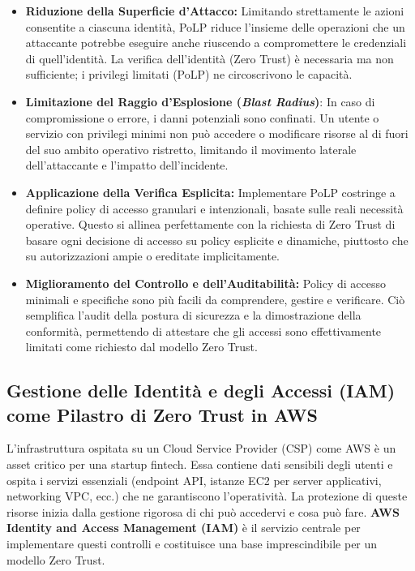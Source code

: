 \begin{itemize}
    \item \textbf{Riduzione della Superficie d'Attacco:} Limitando strettamente le azioni consentite a ciascuna identità, PoLP riduce l'insieme delle operazioni che un attaccante potrebbe eseguire anche riuscendo a compromettere le credenziali di quell'identità. La verifica dell'identità (Zero Trust) è necessaria ma non sufficiente; i privilegi limitati (PoLP) ne circoscrivono le capacità.
    \item \textbf{Limitazione del Raggio d'Esplosione (\textit{Blast Radius})}: In caso di compromissione o errore, i danni potenziali sono confinati. Un utente o servizio con privilegi minimi non può accedere o modificare risorse al di fuori del suo ambito operativo ristretto, limitando il movimento laterale dell'attaccante e l'impatto dell'incidente.
    \item \textbf{Applicazione della Verifica Esplicita:} Implementare PoLP costringe a definire policy di accesso granulari e intenzionali, basate sulle reali necessità operative. Questo si allinea perfettamente con la richiesta di Zero Trust di basare ogni decisione di accesso su policy esplicite e dinamiche, piuttosto che su autorizzazioni ampie o ereditate implicitamente.
    \item \textbf{Miglioramento del Controllo e dell'Auditabilità:} Policy di accesso minimali e specifiche sono più facili da comprendere, gestire e verificare. Ciò semplifica l'audit della postura di sicurezza e la dimostrazione della conformità, permettendo di attestare che gli accessi sono effettivamente limitati come richiesto dal modello Zero Trust.
\end{itemize}
\subsection{Gestione delle Identità e degli Accessi (IAM) come Pilastro di Zero Trust in AWS}
\label{subsec:iam-zero-trust}

L'infrastruttura ospitata su un Cloud Service Provider (CSP) come AWS è un asset critico per una startup fintech. Essa contiene dati sensibili degli utenti e ospita i servizi essenziali (endpoint API, istanze EC2 per server applicativi, networking VPC, ecc.) che ne garantiscono l'operatività. La protezione di queste risorse inizia dalla gestione rigorosa di chi può accedervi e cosa può fare. \textbf{AWS Identity and Access Management (IAM)} è il servizio centrale per implementare questi controlli e costituisce una base imprescindibile per un modello Zero Trust.

